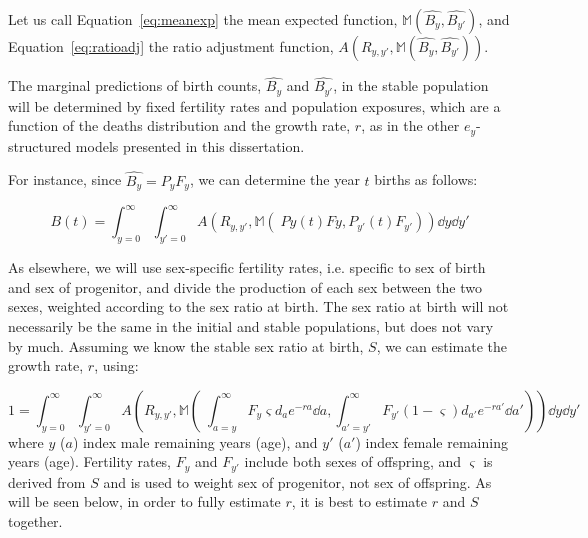 Let us call Equation~\eqref{eq:meanexp} the mean
expected function, $\mathbb{M}(\widehat{B_y}, \widehat{B_{y'}})$, and
Equation~\eqref{eq:ratioadj} the ratio adjustment function, 
$A(R_{y,y'},\mathbb{M}(\widehat{B_y}, \widehat{B_{y'}}))$.

The marginal predictions of birth counts, $\widehat{B_y}$ and
$\widehat{B_{y'}}$, in the stable population will be determined by
fixed fertility rates and population exposures, which are a function of the
deaths distribution and the growth rate, $r$, as in the other $e_y$-structured 
models presented in this dissertation. 

For instance, since $\widehat{B_y} = P_yF_y$, we can determine the year $t$
births as follows:

\begin{equation}
\label{eq:ex2sexCRunity}
B(t) = \int_{y=0}^\infty \int_{y'=0}^\infty
A\left(R_{y,y'},\mathbb{M}\left(\;Py(t)Fy, P_{y'}(t)F_{y'} \right)\right) \dd y
\dd y'
\end{equation} 

As elsewhere, we will use sex-specific
fertility rates, i.e. specific to sex of birth and sex of progenitor, and divide
the production of each sex between the two sexes, weighted according to the sex
ratio at birth. The sex ratio at birth will not necessarily be the same in the
initial and stable populations, but does not vary by much. Assuming we know the
stable sex ratio at birth, $S$, we can estimate the growth rate, $r$, using:

\begin{equation}
\label{eq:ex2sexCRunity}
1 = \int_{y=0}^\infty \int_{y'=0}^\infty
A\left(R_{y,y'},\mathbb{M}\left(\;\int_{a=y}^\infty F_y \varsigma d_a
e^{-ra} \dd a, \int _{a'=y'}^\infty F_{y'} (1-\varsigma) d_{a'} e^{-ra'} \dd
a'\right)\right) \dd y
\dd y'
\end{equation} 
where $y$ ($a$) index male remaining years (age), and $y'$ ($a'$) index female
remaining years (age). Fertility rates, $F_y$ and $F_{y'}$ include both sexes of
offspring, and $\varsigma$ is derived from $S$ and is used to weight sex of
progenitor, not sex of offspring. As will be seen below, in order to fully estimate $r$, it is best
to estimate $r$ and $S$ together.

















